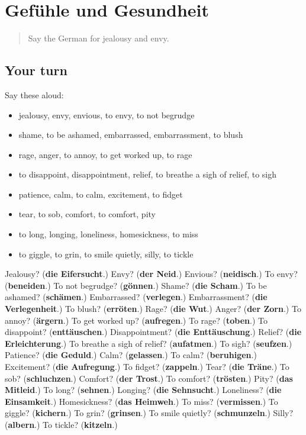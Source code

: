 \section[(dialogue)]{Gefühle und Gesundheit}

\label{lesson:GE-R473-review-466-473}



\begin{quote}
Say the German for jealousy and envy.
\end{quote}

\subsection*{Your turn}
Say these aloud:

\begin{itemize}
\raggedright
  \item jealousy, envy, envious, to envy, to not begrudge
  \item shame, to be ashamed, embarrassed, embarrassment, to blush
  \item rage, anger, to annoy, to get worked up, to rage
  \item to disappoint, disappointment, relief, to breathe a sigh of relief, to sigh
  \item patience, calm, to calm, excitement, to fidget
  \item tear, to sob, comfort, to comfort, pity
  \item to long, longing, loneliness, homesickness, to miss
  \item to giggle, to grin, to smile quietly, silly, to tickle
\end{itemize}

\begin{tcolorbox}[breakable,colback=teal!4,colframe=teal!35!black,title={Before you move on}]
Jealousy? (\textbf{die Eifersucht}.) Envy? (\textbf{der Neid}.) Envious? (\textbf{neidisch}.) To envy? (\textbf{beneiden}.) To not begrudge? (\textbf{gönnen}.) Shame? (\textbf{die Scham}.) To be ashamed? (\textbf{schämen}.) Embarrassed? (\textbf{verlegen}.) Embarrassment? (\textbf{die Verlegenheit}.) To blush? (\textbf{erröten}.) Rage? (\textbf{die Wut}.) Anger? (\textbf{der Zorn}.) To annoy? (\textbf{ärgern}.) To get worked up? (\textbf{aufregen}.) To rage? (\textbf{toben}.) To disappoint? (\textbf{enttäuschen}.) Disappointment? (\textbf{die Enttäuschung}.) Relief? (\textbf{die Erleichterung}.) To breathe a sigh of relief? (\textbf{aufatmen}.) To sigh? (\textbf{seufzen}.) Patience? (\textbf{die Geduld}.) Calm? (\textbf{gelassen}.) To calm? (\textbf{beruhigen}.) Excitement? (\textbf{die Aufregung}.) To fidget? (\textbf{zappeln}.) Tear? (\textbf{die Träne}.) To sob? (\textbf{schluchzen}.) Comfort? (\textbf{der Trost}.) To comfort? (\textbf{trösten}.) Pity? (\textbf{das Mitleid}.) To long? (\textbf{sehnen}.) Longing? (\textbf{die Sehnsucht}.) Loneliness? (\textbf{die Einsamkeit}.) Homesickness? (\textbf{das Heimweh}.) To miss? (\textbf{vermissen}.) To giggle? (\textbf{kichern}.) To grin? (\textbf{grinsen}.) To smile quietly? (\textbf{schmunzeln}.) Silly? (\textbf{albern}.) To tickle? (\textbf{kitzeln}.)
\end{tcolorbox}
